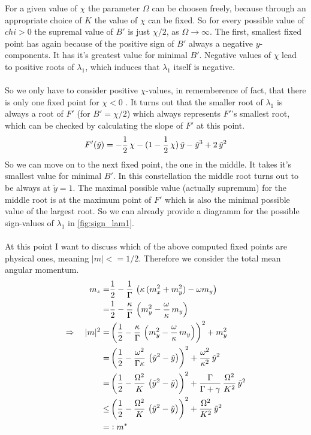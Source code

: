 \documentclass{article}
\begin{document}
For a given value of $\chi$ the parameter $\Omega$ can be choosen freely, because through an appropriate choice of $K$ the value of $\chi$ can be fixed. So for every possible value of $chi>0$ the supremal value of $B'$ is just $\chi/2$, as $\Omega\rightarrow\infty$.
The first, smallest fixed point has again because of the positive sign of $B'$ always a negative $y$-components. It has it's greatest value for minimal $B'$. Negative values of $\chi$ lead to positive roots of $\lambda_1$, which induces that $\lambda_1$ itself is negative. \\\\
So we only have to consider positive $\chi$-values, in rememberence of fact, that there is only one fixed point for $\chi<0$ . It turns out that the smaller root of $\lambda_1$ is always a root of $F'$ (for $B'=\chi/2$) which always represents $F'$'s smallest root, which can be checked by calculating the slope of $F'$ at this point.
\begin{align*}
    F'(\tilde{y})=-\frac{1}{2}\,\chi-(1-\frac{1}{2}\,\chi)\,\tilde{y}    - \tilde{y}^3+2\,\tilde{y}^2
\end{align*}
So we can move on to the next fixed point, the one in the middle. It takes it's smallest value for minimal $B'$. In this constellation the middle root turns out to be always at $\tilde{y}=1$. The maximal possible value (actually supremum) for the middle root is at the maximum point of $F'$ which is also the minimal possible value of the largest root. So we can already provide a diagramm for the possible sign-values of $\lambda_1$ in \autoref{fig:sign_lam1}.\\\\
At this point I want to discuss which of the above computed fixed points are physical ones, meaning $|m|<=1/2$. Therefore we consider the total mean angular momentum.
\begin{align*}
    m_z=&\frac{1}{2}-\frac{1}{\Gamma}\,\left( \kappa\,(m_x^2+m_y^2)-\omega m_y  \right)\\
    =&\frac{1}{2}-\frac{\kappa}{\Gamma}\,\left( m_y^2-\frac{\omega}{\kappa}\, m_y  \right)\\
    \Rightarrow\quad |m|^2=&\left( \frac{1}{2}-\frac{\kappa}{\Gamma}\,\left( m_y^2-\frac{\omega}{\kappa}\, m_y  \right) \right)^2+m_y^2\\
    =&\left( \frac{1}{2}-\frac{\omega^2}{\Gamma\kappa}\,\left( \tilde{y}^2- \tilde{y} \right) \right)^2+\frac{\omega^2}{\kappa^2}\,\tilde{y}^2\\
    =&\left( \frac{1}{2}-\frac{\Omega^2}{K}\,\left( \tilde{y}^2- \tilde{y} \right) \right)^2+\frac{\Gamma}{\Gamma+\gamma}\,\frac{\Omega^2}{K^2}\,\tilde{y}^2\\
    \leq&\left( \frac{1}{2}-\frac{\Omega^2}{K}\,\left( \tilde{y}^2- \tilde{y} \right) \right)^2+\frac{\Omega^2}{K^2}\,\tilde{y}^2\\
    =&\vcentcolon m^*
\end{align*}
\end{document}
